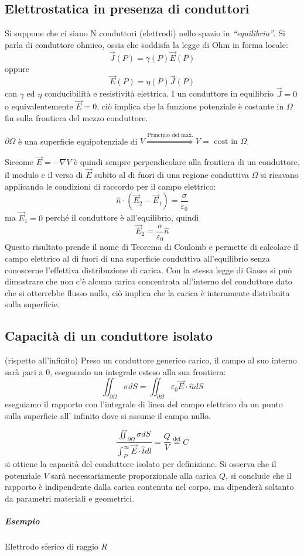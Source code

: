 \subsection{Elettrostatica in presenza di conduttori}
Si suppone che ci siano N conduttori (elettrodi) nello spazio in \textit{``equilibrio''}.
Si parla di conduttore ohmico, ossia che soddisfa la legge di Ohm in forma locale:
$$
\vec{J}(P) = \gamma(P)\vec{E}(P)
$$
oppure
$$
\vec{E}(P) = \eta(P)\vec{J}(P)
$$
con $\gamma$ ed $\eta$ conducibilità e resistività elettrica.
I un conduttore in equilibrio $\vec{J} = 0$ o equivalentemente $\vec{E} = 0$, ciò implica 
che la funzione potenziale è costante in $\Omega$ fin sulla frontiera del mezzo conduttore.

$\partial \Omega$ è una superficie equipotenziale di $V \stackrel{\text{Principio del max.}}{\Rightarrow} V = \text{ cost in } \Omega$.

Siccome $\vec{E} = -\nabla V$ è quindi sempre perpendicolare alla frontiera di un conduttore,
il modulo e il verso di $\vec{E}$ subito al di fuori di una regione conduttiva $\Omega$ 
si ricavano applicando le condizioni di raccordo per il campo elettrico:
$$
\hat{n}\cdot (\vec{E}_2-\vec{E}_1) = \frac{\sigma}{\varepsilon_0}
$$
ma $\vec{E}_1 = 0$ perché il conduttore è all'equilibrio, quindi 
$$
\vec{E}_2 = \frac{\sigma}{\varepsilon_0} \hat{n}
$$
Questo risultato prende il nome di Teorema di Coulomb e permette di calcolare il campo elettrico al 
di fuori di una superficie conduttiva all'equilibrio senza conoscerne l'effettiva distribuzione di 
carica.
Con la stessa legge di Gauss si può dimostrare che non c'è alcuna carica concentrata all'interno
del conduttore dato che si otterrebbe flusso nullo, ciò implica che la carica è interamente
distribuita sulla superficie.

\subsection{Capacità di un conduttore isolato} (rispetto all'infinito)
Preso un conduttore generico carico, il campo al suo interno sarà pari a 0, eseguendo un integrale
esteso alla sua frontiera:
$$
\iint_{\partial \Omega}\sigma dS = \iint_{\partial \Omega} \varepsilon_0 \vec{E}\cdot \hat{n} dS
$$
eseguiamo il rapporto con l'integrale di linea del campo elettrico da un punto sulla superficie all'
infinito dove si assume il campo nullo.

$$
\frac{\iint_{\partial \Omega}\sigma dS }{\int_P^\infty \vec{E}\cdot\hat{t}dl } = \frac{Q}{V} \stackrel{\text{def}}{=} C
$$
si ottiene la capacità del conduttore isolato per definizione.
Si osserva che il potenziale $V$ sarà necessariamente proporzionale alla carica $Q$, si 
conclude che il rapporto è indipendente dalla carica contenuta nel corpo, ma dipenderà soltanto da
parametri materiali e geometrici.
\subparagraph{Esempio}
Elettrodo sferico di raggio $R$

